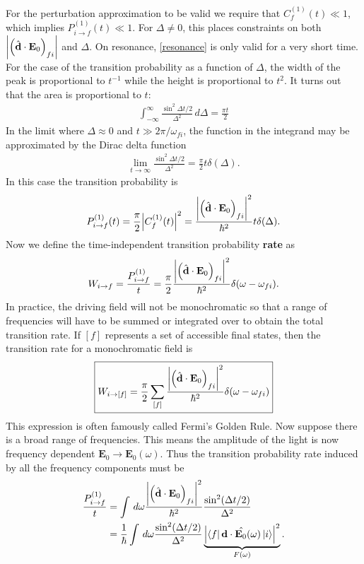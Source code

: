 \documentclass{book}
\theoremstyle{definition}
\newcommand{\f}[2]{\frac{#1}{#2}}
\newcommand{\lp}{\left(}
\newcommand{\rp}{\right)}
\begin{document}
For the perturbation approximation to be valid we require that $C^{(1)}_f(t) \ll 1$, which implies $P_{i \to f}^{(1)}(t) \ll 1$. For $\Delta \neq 0$, this places constraints on both $\abs{\lp \hat{\mathbf{d}}\cdot\mathbf{E}_0 \rp_{fi}}$ and $\Delta$. On resonance, \eqref{resonance} is only valid for a very short time. For the case of the transition probability as a function of $\Delta$, the width of the peak is proportional to $t^{-1}$ while the height is proportional to $t^2$. It turns out that the area is proportional to $t$:
\begin{align}
\int^{\infty}_{-\infty} \f{\sin^2 \Delta t/2}{\Delta^2} \,d\Delta = \f{\pi t}{2}
\end{align}
In the limit where $\Delta \approx 0$ and $t \gg 2\pi/\omega_{fi}$, the function in the integrand may be approximated by the Dirac delta function
\begin{align}
\lim_{t\to\infty}\f{\sin^2 \Delta t/2}{\Delta^2} = \f{\pi}{2}t\delta(\Delta).
\end{align}
In this case the transition probability is
\begin{align}
P^{(1)}_{i\to f}(t) = \f{\pi}{2}\abs{C^{(1)}_f(t)}^2 = \f{\abs{\lp \hat{\mathbf{d}}\cdot\mathbf{E}_0 \rp_{fi}}^2}{\hbar^2} t \delta(\Delta).
\end{align}
Now we define the time-independent transition probability \textbf{rate} as
\begin{align}
W_{i\to f} = \f{P^{(1)}_{i\to f}}{t} = \f{\pi}{2} \f{\abs{\lp \hat{\mathbf{d}}\cdot\mathbf{E}_0 \rp_{fi}}^2}{\hbar^2} \delta(\omega - \omega_{fi}).
\end{align}
In practice, the driving field will not be monochromatic so that a range of
frequencies will have to be summed or integrated over to obtain the total transition rate.  If $[f]$ represents a set of accessible final states, then the transition rate for a monochromatic field is
\begin{align}
\boxed{W_{i\to [f]} = \f{\pi}{2}\sum_{[f]}\f{\abs{\lp \hat{\mathbf{d}}\cdot\mathbf{E}_0 \rp_{fi}}^2}{\hbar^2} \delta(\omega - \omega_{fi})}
\end{align}
This expression is often famously called Fermi's Golden Rule. Now suppose there is a broad range of frequencies. This means the amplitude of the light is now frequency dependent $\mathbf{E}_0 \to \mathbf{E}_0(\omega)$. Thus the transition probability rate induced by all the frequency components must be
\begin{align}
\f{P^{(1)}_{i\to f}}{t} &=  \int \, d\omega \f{\abs{\lp \hat{\mathbf{d}}\cdot\mathbf{E}_0 \rp_{fi}}^2}{\hbar^2} \f{\sin^2(\Delta t/2)}{\Delta^2}\\
&= \f{1}{\hbar}\int \,d\omega \f{\sin^2(\Delta t/2)}{\Delta^2} \underbrace{\abs{\bra{f}\hat{\mathbf{d}\cdot\mathbf{E}_0(\omega)}\ket{i}}^2}_{F(\omega)}.
\end{align}
\end{document}
